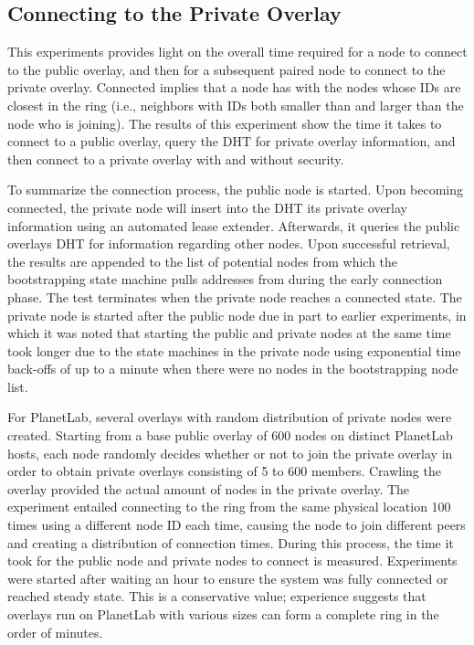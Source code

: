 \subsection{Connecting to the Private Overlay}
This experiments provides light on the overall time required for a node to
connect to the public overlay, and then for a subsequent paired node to connect
to the private overlay.  Connected implies that a node has with the nodes whose
IDs are closest in the ring (i.e., neighbors with IDs both smaller than and
larger than the node who is joining).  The results of this experiment show the
time it takes to connect to a public overlay, query the DHT for private overlay
information, and then connect to a private overlay with and without security.

To summarize the connection process, the public node is started.  Upon becoming
connected, the private node will insert into the DHT its private overlay
information using an automated lease extender.  Afterwards, it queries the
public overlays DHT for information regarding other nodes.  Upon successful
retrieval, the results are appended to the list of potential nodes from which
the bootstrapping state machine pulls addresses from during the early
connection phase.  The test terminates when the private node reaches a
connected state.  The private node is started after the public node due in part
to earlier experiments, in which it was noted that starting the public and
private nodes at the same time took longer due to the state machines in the
private node using exponential time back-offs of up to a minute when there
were no nodes in the bootstrapping node list.

For PlanetLab, several overlays with random distribution of private nodes were
created.  Starting from a base public overlay of 600 nodes on distinct PlanetLab
hosts, each node randomly decides whether or not to join the private overlay in
order to obtain private overlays consisting of 5 to 600 members.  Crawling the
overlay provided the actual amount of nodes in the private overlay.  The
experiment entailed connecting to the ring from the same physical location 100
times using a different node ID each time, causing the node to join different
peers and creating a distribution of connection times. During this process, the
time it took for the public node and private nodes to connect is measured.  
Experiments were started after waiting an hour to ensure the system was fully
connected or reached steady state.  This is a conservative value; experience
suggests that overlays run on PlanetLab with various sizes can form a complete
ring in the order of minutes.

